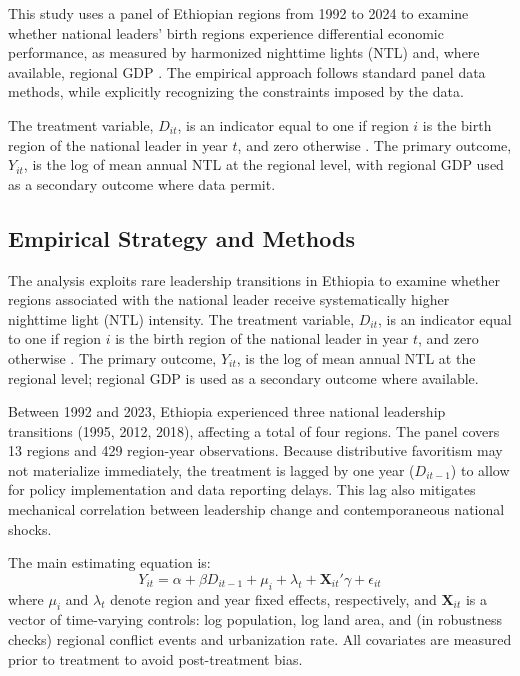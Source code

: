 \documentclass[12pt,a4paper]{article}
\begin{document}
This study uses a panel of Ethiopian regions from 1992 to 2024 to examine whether national leaders’ birth regions experience differential economic performance, as measured by harmonized nighttime lights (NTL) and, where available, regional GDP \citep{Li2023, Henderson2012}. The empirical approach follows standard panel data methods, while explicitly recognizing the constraints imposed by the data.

The treatment variable, $D_{it}$, is an indicator equal to one if region $i$ is the birth region of the national leader in year $t$, and zero otherwise \citep{Hodler2014}. The primary outcome, $Y_{it}$, is the log of mean annual NTL at the regional level, with regional GDP used as a secondary outcome where data permit.

\subsection{Empirical Strategy and Methods}

The analysis exploits rare leadership transitions in Ethiopia to examine whether regions associated with the national leader receive systematically higher nighttime light (NTL) intensity. The treatment variable, $D_{it}$, is an indicator equal to one if region $i$ is the birth region of the national leader in year $t$, and zero otherwise \citep{Hodler2014}. The primary outcome, $Y_{it}$, is the log of mean annual NTL at the regional level; regional GDP is used as a secondary outcome where available.

Between 1992 and 2023, Ethiopia experienced three national leadership transitions (1995, 2012, 2018), affecting a total of four regions. The panel covers 13 regions and 429 region-year observations. Because distributive favoritism may not materialize immediately, the treatment is lagged by one year ($D_{it-1}$) to allow for policy implementation and data reporting delays. This lag also mitigates mechanical correlation between leadership change and contemporaneous national shocks.

The main estimating equation is:
\begin{equation}
Y_{it} = \alpha + \beta D_{it-1} + \mu_i + \lambda_t + \mathbf{X}_{it}'\gamma + \epsilon_{it}
\end{equation}
where $\mu_i$ and $\lambda_t$ denote region and year fixed effects, respectively, and $\mathbf{X}_{it}$ is a vector of time-varying controls: log population, log land area, and (in robustness checks) regional conflict events and urbanization rate. All covariates are measured prior to treatment to avoid post-treatment bias.
\end{document}
